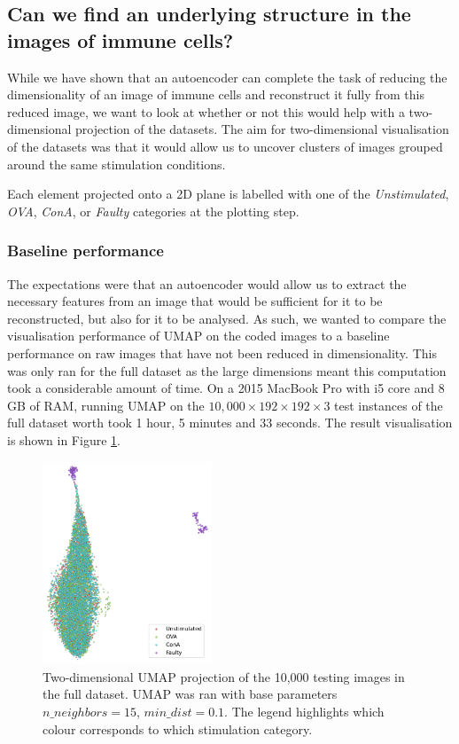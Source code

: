 \subsection{Can we find an underlying structure in the images of immune cells?}

While we have shown that an autoencoder can complete the task of reducing the dimensionality of an image of immune cells and reconstruct it fully from this reduced image, we want to look at whether or not this would help with a two-dimensional projection of the datasets. The aim for two-dimensional visualisation of the datasets was that it would allow us to uncover clusters of images grouped around the same stimulation conditions.

Each element projected onto a 2D plane is labelled with one of the \textit{Unstimulated}, \textit{OVA}, \textit{ConA}, or \textit{Faulty} categories at the plotting step.

\bigskip
\subsubsection{Baseline performance}
\hfill
\hfill

The expectations were that an autoencoder would allow us to extract the necessary features from an image that would be sufficient for it to be reconstructed, but also for it to be analysed. As such, we wanted to compare the visualisation performance of UMAP on the coded images to a baseline performance on raw images that have not been reduced in dimensionality. This was only ran for the full dataset as the large dimensions meant this computation took a considerable amount of time. On a 2015 MacBook Pro with i5 core and 8 GB of RAM, running UMAP on the $10,000\times192\times192\times3$ test instances of the full dataset worth took 1 hour, 5 minutes and 33 seconds. The result visualisation is shown in Figure \ref{fig:baseline_vis}.


\begin{figure}[h!]
    \centering
    \includegraphics[width=0.45\textwidth]{dissertation/figures/evaluation/CK19_baseline_visualisation.png}
    \caption{Two-dimensional UMAP projection of the 10,000 testing images in the full dataset. UMAP was ran with base parameters $n\_neighbors=15$, $min\_dist=0.1$. The legend highlights which colour corresponds to which stimulation category.}
    \label{fig:baseline_vis}
\end{figure}

